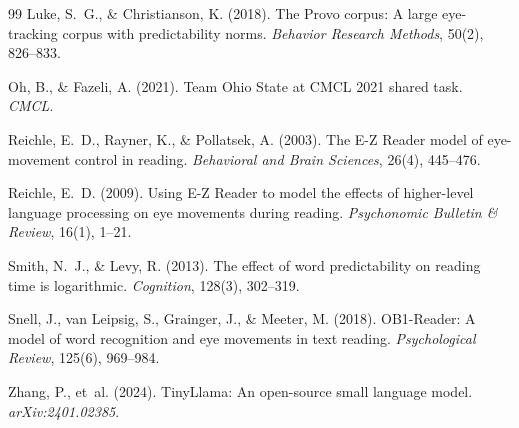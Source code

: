 \documentclass[11pt]{article}
\begin{document}
\begin{thebibliography}{99}
Luke, S.~G., \& Christianson, K. (2018). The Provo corpus: A large eye-tracking corpus with predictability norms. \emph{Behavior Research Methods}, 50(2), 826--833.

Oh, B., \& Fazeli, A. (2021). Team Ohio State at CMCL 2021 shared task. \emph{CMCL}.

Reichle, E.~D., Rayner, K., \& Pollatsek, A. (2003). The E-Z Reader model of eye-movement control in reading. \emph{Behavioral and Brain Sciences}, 26(4), 445--476.

Reichle, E.~D. (2009). Using E-Z Reader to model the effects of higher-level language processing on eye movements during reading. \emph{Psychonomic Bulletin \& Review}, 16(1), 1--21.

Smith, N.~J., \& Levy, R. (2013). The effect of word predictability on reading time is logarithmic. \emph{Cognition}, 128(3), 302--319.

Snell, J., van Leipsig, S., Grainger, J., \& Meeter, M. (2018). OB1-Reader: A model of word recognition and eye movements in text reading. \emph{Psychological Review}, 125(6), 969--984.

Zhang, P., et~al. (2024). TinyLlama: An open-source small language model. \emph{arXiv:2401.02385}.

\end{thebibliography}
\end{document}
